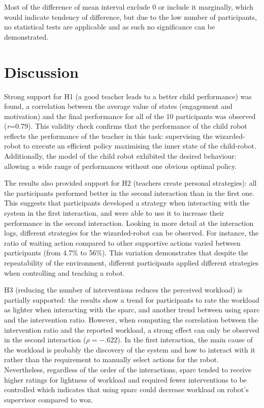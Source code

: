 Most of the difference of mean interval exclude 0 or include it marginally, which would indicate tendency of difference, but due to the low number of participants, no statistical tests are applicable and as such no significance can be demonstrated. 


\section{Discussion}

Strong support for H1 (a good teacher leads to a better child performance) was found, a correlation between the average value of states (engagement and motivation) and the final performance for all of the 10 participants was observed (\textit{r}=0.79). This validity check confirms that the performance of the child robot reflects the performance of the teacher in this task: supervising the wizarded-robot to execute an efficient policy maximising the inner state of the child-robot. Additionally, the model of the child robot exhibited the desired behaviour: allowing a wide range of performances without one obvious optimal policy.

The results also provided support for H2 (teachers create personal strategies): all the participants performed better in the second interaction than in the first one. This suggests that participants developed a strategy when interacting with the system in the first interaction, and were able to use it to increase their performance in the second interaction. Looking in more detail at the interaction logs, different strategies for the wizarded-robot can be observed. For instance, the ratio of waiting action compared to other supportive actions varied between participants (from 4.7\% to 56\%). This variation demonstrates that despite the repeatability of the environment, different participants applied different strategies when controlling and teaching a robot.

H3 (reducing the number of interventions reduces the perceived workload) is partially supported: the results show a trend for participants to rate the workload as lighter when interacting with the \gls{sparc}, and another trend between using \gls{sparc} and the intervention ratio. However, when computing the correlation between the intervention ratio and the reported workload, a strong effect can only be observed in the second interaction ($\rho = -.622$). In the first interaction, the main cause of the workload is probably the discovery of the system and how to interact with it rather than the requirement to manually select actions for the robot. Nevertheless, regardless of the order of the interactions, \gls{sparc} tended to receive higher ratings for lightness of workload and required fewer interventions to be controlled which indicates that using \gls{sparc} could decrease workload on robot's supervisor compared to \gls{woz}.

